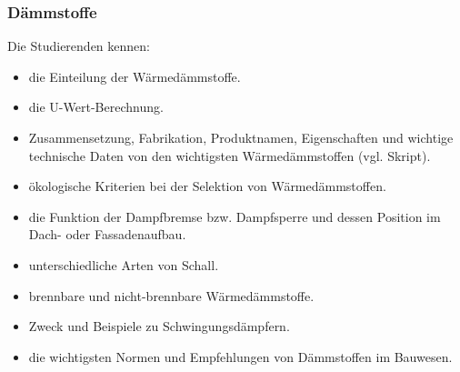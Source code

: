 \subsubsection*{Dämmstoffe}

Die Studierenden kennen: 

\begin{itemize}
	\item die Einteilung der Wärmedämmstoffe.
	\item die U-Wert-Berechnung.
	\item Zusammensetzung, Fabrikation, Produktnamen, Eigenschaften und wichtige technische Daten von den wichtigsten Wärmedämmstoffen (vgl. Skript).
	\item ökologische Kriterien bei der Selektion von Wärmedämmstoffen.
	\item die Funktion der Dampfbremse bzw. Dampfsperre und dessen Position im Dach- oder Fassadenaufbau.
	\item  unterschiedliche Arten von Schall.
	\item brennbare und nicht-brennbare Wärmedämmstoffe.
	\item Zweck und Beispiele zu Schwingungsdämpfern.
	\item  die wichtigsten Normen und Empfehlungen von Dämmstoffen im Bauwesen.

\end{itemize}